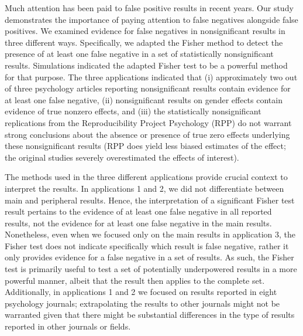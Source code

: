 \documentclass{article}
\begin{document}
Much attention has been paid to false positive results in recent years. Our study demonstrates the importance of paying attention to false negatives alongside false positives. We examined evidence for false negatives in nonsignificant results in three different ways. Specifically, we adapted the Fisher method to detect the presence of at least one false negative in a set of statistically nonsignificant results. Simulations indicated the adapted Fisher test to be a powerful method for that purpose. The three applications indicated that (i) approximately two out of three psychology articles reporting nonsignificant results contain evidence for at least one false negative, (ii) nonsignificant results on gender effects contain evidence of true nonzero effects, and (iii) the statistically nonsignificant replications from the Reproducibility Project Psychology (RPP) do not warrant strong conclusions about the absence or presence of true zero effects underlying these nonsignificant results (RPP does yield less biased estimates of the effect; the original studies severely overestimated the effects of interest).

The methods used in the three different applications provide crucial context to interpret the results. In applications 1 and 2, we did not differentiate between main and peripheral results. Hence, the interpretation of a significant Fisher test result pertains to the evidence of at least one false negative in all reported results, not the evidence for at least one false negative in the main results. Nonetheless, even when we focused only on the main results in application 3, the Fisher test does not indicate specifically which result is false negative, rather it only provides evidence for a false negative in a set of results. As such, the Fisher test is primarily useful to test a set of potentially underpowered results in a more powerful manner, albeit that the result then applies to the complete set. Additionally, in applications 1 and 2 we focused on results reported in eight psychology journals; extrapolating the results to other journals might not be warranted given that there might be substantial differences in the type of results reported in other journals or fields. 
\end{document}
